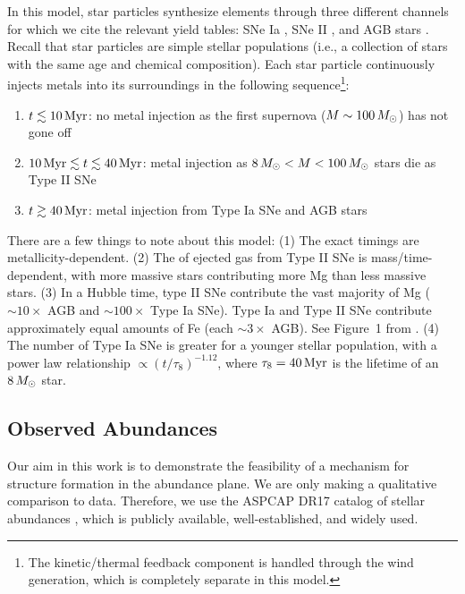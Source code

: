 In this model, star particles synthesize elements through three different channels for which we cite the relevant yield tables: SNe Ia \citep{1997NuPhA.621..467N}, SNe II \citep{1998A&A...334..505P,2006ApJ...653.1145K}, and AGB stars \citep{2010MNRAS.403.1413K,2014MNRAS.437..195D,2014ApJ...797...44F}. Recall that star particles are simple stellar populations (i.e., a collection of stars with the same age and chemical composition). Each star particle continuously injects metals into its surroundings in the following sequence\footnote{The kinetic/thermal feedback component is handled through the wind generation, which is completely separate in this model.}:
\begin{enumerate}
    \item $t\lesssim10\,\textrm{Myr}$: no metal injection as the first supernova ($M\sim100\,M_{\odot}$) has not gone off
    \item $10\,\textrm{Myr} \lesssim t \lesssim 40\,\textrm{Myr}$: metal injection as $8\,M_{\odot}<M<100\,M_{\odot}$ stars die as Type II SNe
    \item $t\gtrsim40\,\textrm{Myr}$: metal injection from Type Ia SNe and AGB stars
\end{enumerate}
There are a few things to note about this model: (1) The exact timings are metallicity-dependent. (2) The \MgFe{} of ejected gas from Type II SNe is mass/time-dependent, with more massive stars contributing more Mg than less massive stars. (3) In a Hubble time, type II SNe contribute the vast majority of Mg ($\sim10\times$ AGB and $\sim100\times$ Type Ia SNe). Type Ia and Type II SNe contribute approximately equal amounts of Fe (each $\sim3\times$ AGB). See Figure~1 from \citet{2018MNRAS.473.4077P}. (4) The number of Type Ia SNe is greater for a younger stellar population, with a power law relationship $\propto \left(t/\tau_8\right)^{-1.12}$, where $\tau_8=40\,\textrm{Myr}$ is the lifetime of an $8\,M_{\odot}$ star.

\subsection{Observed Abundances}\label{ssec:obs_abund}
Our aim in this work is to demonstrate the feasibility of a mechanism for structure formation in the abundance plane. We are only making a qualitative comparison to data. Therefore, we use the ASPCAP DR17 catalog of stellar abundances \citep[][J.A.~Holtzman et al., in preparation]{2016AJ....151..144G}, which is publicly available, well-established, and widely used.

